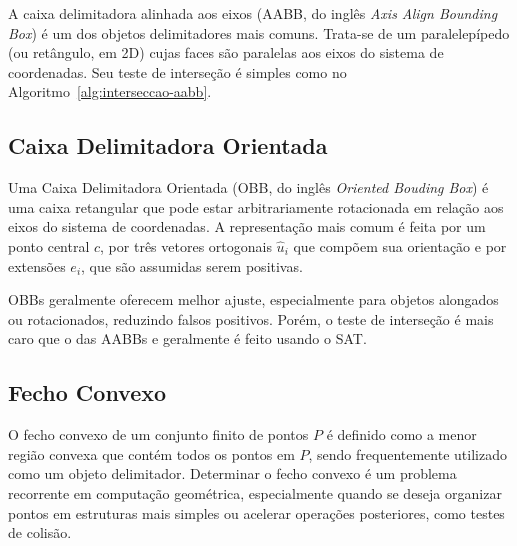 A caixa delimitadora alinhada aos eixos (AABB, do inglês \textit{Axis Align Bounding Box}) é um dos objetos delimitadores mais comuns. Trata-se de um paralelepípedo (ou retângulo, em 2D) cujas faces são paralelas aos eixos do sistema de coordenadas. Seu teste de interseção é simples como no Algoritmo~\ref{alg:interseccao-aabb}.
\begin{algorithm}[htb]
	\caption{Teste de Intersecção AABB}
	
	\label{alg:interseccao-aabb}
\end{algorithm}

\subsection*{Caixa Delimitadora Orientada}

Uma Caixa Delimitadora Orientada (OBB, do inglês \textit{Oriented Bouding Box}) é uma caixa retangular que pode estar arbitrariamente rotacionada em relação aos eixos do sistema de coordenadas. A representação mais comum é feita por um ponto central $c$, por três vetores ortogonais $\hat{u}_i$ que compõem sua orientação e por extensões $e_i$, que são assumidas serem positivas.

OBBs geralmente oferecem melhor ajuste, especialmente para objetos alongados ou rotacionados, reduzindo falsos positivos. Porém, o teste de interseção é mais caro que o das AABBs e geralmente é feito usando o SAT.

\subsection*{Fecho Convexo}

O fecho convexo de um conjunto finito de pontos $P$ é definido como a menor região convexa que contém todos os pontos em $P$, sendo frequentemente utilizado como um objeto delimitador. Determinar o fecho convexo é um problema recorrente em computação geométrica, especialmente quando se deseja organizar pontos em estruturas mais simples ou acelerar operações posteriores, como testes de colisão.

